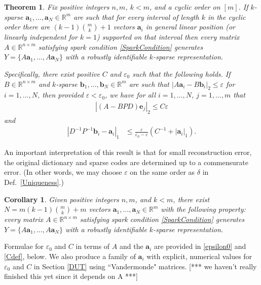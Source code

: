 \documentclass[journal, onecolumn]{IEEEtran}
\newtheorem{theorem}{Theorem}
\newtheorem{corollary}{Corollary}
\begin{document}
\begin{theorem}\label{DeterministicUniquenessTheorem}
Fix positive integers $n, m$, $k < m$, and a cyclic order on $[m]$. If $k$-sparse $\mathbf{a}_1, \ldots, \mathbf{a}_N \in \mathbb{R}^m$ are such that for every interval of length $k$ in the cyclic order there are $(k-1){m \choose k}+1$ vectors $\mathbf{a}_i$ in general linear position (or linearly independent for $k=1$) supported on that interval then every matrix $A \in \mathbb{R}^{n \times m}$ satisfying spark condition \eqref{SparkCondition} generates $Y = \{A\mathbf{a}_1, \ldots, A\mathbf{a}_N\}$ with a robustly identifiable $k$-sparse representation.

Specifically, there exist positive $C$ and $\varepsilon_0$ such that the following holds. If $B \in \mathbb{R}^{n \times m}$ and $k$-sparse $\mathbf{b}_1, \ldots, \mathbf{b}_N \in \mathbb{R}^m$ are such that $|A\mathbf{a}_i - B\mathbf{b}_i|_2 \leq \varepsilon$ for $i = 1, \ldots, N$, then provided $\varepsilon < \varepsilon_0$, we have for all $i = 1, \ldots, N$, $j = 1, \ldots, m$  that
\begin{align}\label{Cstable}
|(A-BPD)\mathbf{e}_j|_2 \leq C\varepsilon
\end{align}
and 
\begin{align}\label{b-PDa}
|D^{-1}P^{-1}\mathbf{b}_i - \mathbf{a}_i|_1 &\leq \frac{\varepsilon }{\varepsilon_0 - \varepsilon} \left( C^{-1}+|\mathbf{a}_i|_1 \right).
\end{align}
\end{theorem}
An important interpretation of this result is that for small reconstruction error, the original dictionary and sparse codes are determined up to a commensurate error.  (In other words, we may choose $\varepsilon$ on the same order as $\delta$ in Def.~\ref{Uniqueness}.)

\begin{corollary}\label{DeterministicUniquenessCorollary}
Given positive integers $n, m$, and $k < m$, there exist $N =  m(k-1){m \choose k}+m$ vectors $\mathbf{a}_1, \ldots, \mathbf{a}_N \in \mathbb{R}^m$ with the following property: every matrix $A \in \mathbb{R}^{n \times m}$ satisfying spark condition \eqref{SparkCondition} generates $Y = \{A\mathbf{a}_1, \ldots, A\mathbf{a}_N\}$ with a robustly identifiable $k$-sparse representation.
\end{corollary}

Formulae for $\varepsilon_0$ and $C$ in terms of $A$ and the $\mathbf{a}_i$ are provided in \eqref{epsilon0} and \eqref{Cdef}, below. We also produce a family of $\mathbf{a}_i$ with explicit, numerical values for $\varepsilon_0$ and $C$ in Section \ref{DUT} using ``Vandermonde" matrices. [*** we haven't really finished this yet since it depends on A ***]
\end{document}
